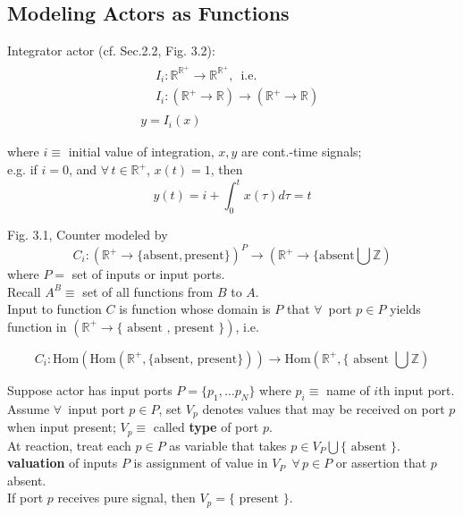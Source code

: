 \documentclass[10pt]{amsart}
\begin{document}
\begin{multicols*}{2}
\subsection{Modeling Actors as Functions}

Integrator actor (cf. Sec.2.2, Fig. 3.2):
\[
\begin{gathered}
\begin{aligned}
& I_i : \mathbb{R}^{\mathbb{R}^+} \to \mathbb{R}^{\mathbb{R}^+}, \, \text{ i.e. } \\
& I_i : (\mathbb{R}^+ \to \mathbb{R}) \to (\mathbb{R}^+ \to \mathbb{R})
\end{aligned}\\
y = I_i(x)
\end{gathered}
\]

where $i\equiv $ initial value of integration, $x,y$ are cont.-time signals; \\
e.g. if $i=0$, and $\forall \, t \in \mathbb{R}^+$, $x(t) = 1$, then 
\[
y(t) = i + \int_0^t x(\tau) d\tau = t
\]

Fig. 3.1, Counter modeled by
\[
C_i: (\mathbb{R}^+ \to \lbrace \text{absent}, \text{present} \rbrace)^P \to (\mathbb{R}^+ \to \lbrace \text{absent} \bigcup \mathbb{Z})
\]
where $P = $ set of inputs or input ports. \\

Recall $A^B \equiv$ set of all functions from $B$ to $A$. \\

Input to function $C$ is function whose domain is $P$ that $\forall \, $ port $p\in P$ yields function in $(\mathbb{R}^+ \to \lbrace \text{ absent , present } \rbrace )$, i.e.

\[
C_i: \text{Hom}( \text{Hom}(\mathbb{R}^+ , \lbrace \text{absent, present} \rbrace )) \to \text{Hom}(\mathbb{R}^+, \lbrace \text{ absent } \bigcup \mathbb{Z} )
\]

Suppose actor has input ports $P = \lbrace p_1, \dots p_N \rbrace$ where $p_i \equiv $ name of $i$th input port. \\

Assume $\forall \, $ input port $p\in P$, set $V_p$ denotes values that may be received on port $p$ when input present; $V_p \equiv$ called \textbf{type} of port $p$. \\
At reaction, treat each $p \in P$ as variable that takes $p\in V_P \bigcup \lbrace \text{ absent } \rbrace$. \\
\textbf{valuation} of inputs $P$ is assignment of value in $V_P$\, $\forall \, p \in P$ or assertion that $p$ absent. \\
If port $p$ receives pure signal, then $V_p = \lbrace \text{ present } \rbrace$. \\


\end{multicols*}
\end{document}
